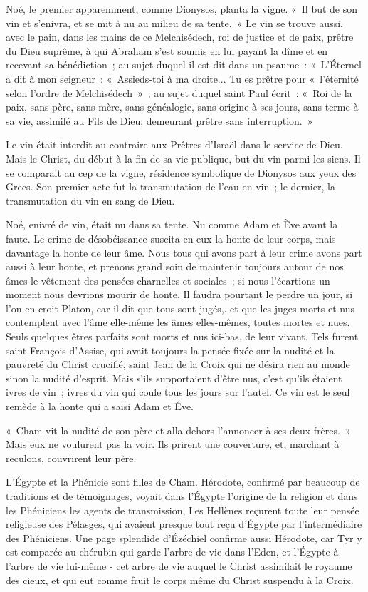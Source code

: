 \documentclass[french,twoside]{book} %
\begin{document}
Noé, le premier apparemment, comme Dionysos, planta la vigne. « Il but de son vin et s'enivra, et se mit à nu au milieu de sa tente. » Le vin se trouve aussi, avec le pain, dans les mains de ce Melchisédech, roi de justice et de paix, prêtre du Dieu suprême, à qui Abraham s'est soumis en lui payant la dîme et en recevant sa bénédiction ; au sujet duquel il est dit dans un psaume : « L'Éternel a dit à mon seigneur : « Assieds-toi à ma droite... Tu es prêtre pour « l'éternité selon l'ordre de Melchisédech » ; au sujet duquel saint Paul écrit : « Roi de la paix, sans père, sans mère, sans généalogie, sans origine à ses jours, sans terme à sa vie, assimilé au Fils de Dieu, demeurant prêtre sans interruption. »\par
Le vin était interdit au contraire aux Prêtres d'Israël dans le service de Dieu. Mais le Christ, du début à la fin de sa vie publique, but du vin parmi les siens. Il se comparait au cep de la vigne, résidence symbolique de Dionysos aux yeux des Grecs. Son premier acte fut la transmutation de l'eau en vin ; le dernier, la transmutation du vin en sang de Dieu.\par
Noé, enivré de vin, était nu dans sa tente. Nu comme Adam et Ève avant la faute. Le crime de désobéissance suscita en eux la honte de leur corps, mais davantage la honte de leur âme. Nous tous qui avons part à leur crime avons part aussi à leur honte, et prenons grand soin de maintenir toujours autour de nos âmes le vêtement des pensées charnelles et sociales ; si nous l'écartions un moment nous devrions mourir de honte. Il faudra pourtant le perdre un jour, si l'on en croit Platon, car il dit que tous sont jugés,. et que les juges morts et nus contemplent avec l'âme elle-même les âmes elles-mêmes, toutes mortes et nues. Seuls quelques êtres parfaits sont morts et nus ici-bas, de leur vivant. Tels furent saint François d'Assise, qui avait toujours la pensée fixée sur la nudité et la pauvreté du Christ crucifié, saint Jean de la Croix qui ne désira rien au monde sinon la nudité d'esprit. Mais s'ils supportaient d'être nus, c'est qu'ils étaient ivres de vin ; ivres du vin qui coule tous les jours sur l'autel. Ce vin est le seul remède à la honte qui a saisi Adam et Éve.\par
« Cham vit la nudité de son père et alla dehors l'annoncer à ses deux frères. » Mais eux ne voulurent pas la voir. Ils prirent une couverture, et, marchant à reculons, couvrirent leur père.\par
L'Égypte et la Phénicie sont filles de Cham. Hérodote, confirmé par beaucoup de traditions et de témoignages, voyait dans l'Égypte l'origine de la religion et dans les Phéniciens les agents de transmission, Les Hellènes reçurent toute leur pensée religieuse des Pélasges, qui avaient presque tout reçu d'Égypte par l'intermédiaire des Phéniciens. Une page splendide d'Ézéchiel confirme aussi Hérodote, car Tyr y est comparée au chérubin qui garde l'arbre de vie dans l'Eden, et l'Égypte à l'arbre de vie lui-même - cet arbre de vie auquel le Christ assimilait le royaume des cieux, et qui eut comme fruit le corps même du Christ suspendu à la Croix.\par
\end{document}
